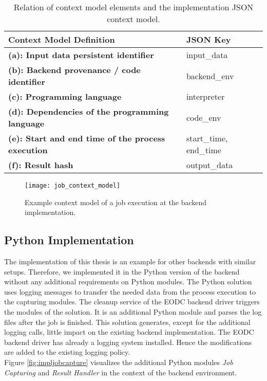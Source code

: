 \documentclass[draft,final]{vutinfth} %
\newcommand{\bgoesswein}[1]{{\color{blue}#1}}
\begin{document}
\begin{table}[]
	\caption{Relation of context model elements and the implementation JSON context model.}
	\begin{tabular}{l|l}
		\textbf{Context Model Definition} & \textbf{JSON Key} \\ \hline
		\textbf{(a): Input data persistent identifier} & input\_data \\ \hline
		\textbf{(b): Backend provenance / code identifier} & backend\_env \\ \hline
		\textbf{(c): Programming language} & interpreter \\ \hline
		\textbf{(d): Dependencies of the programming language} & code\_env \\ \hline
		\textbf{(e): Start and end time of the process execution} & start\_time, end\_time \\ \hline
		\textbf{(f): Result hash} & output\_data \\ %
	\end{tabular}
\label{Tab:contextmodel}
\end{table}

\begin{figure}[h]
	\centering
	\texttt{[image: job\_context\_model]}
	\caption{Example context model of a job execution at the backend implementation.}
	\label{fig:job_context_model} %
\end{figure}

\subsection{Python Implementation}\label{Implementation:Python Implementation}
The implementation of this thesis is an example for other backends with similar setups. Therefore, we implemented it in the Python version of the backend without any additional \bgoesswein{requirements on Python modules}. The Python solution uses logging messages to transfer the needed data from the process execution to the capturing modules. The cleanup service of the EODC backend driver triggers the modules of the solution. It is an additional Python module and parses the log files after the job is finished. This solution generates, except for the additional logging calls, little impact on the existing backend implementation. The EODC backend driver has already a logging system installed. Hence the modifications are added to the existing logging policy. \\
Figure \ref{fig:impljobcapture} visualizes the additional Python modules \textit{Job Capturing} and \textit{Result Handler} in the context of the backend environment. 
\end{document}
